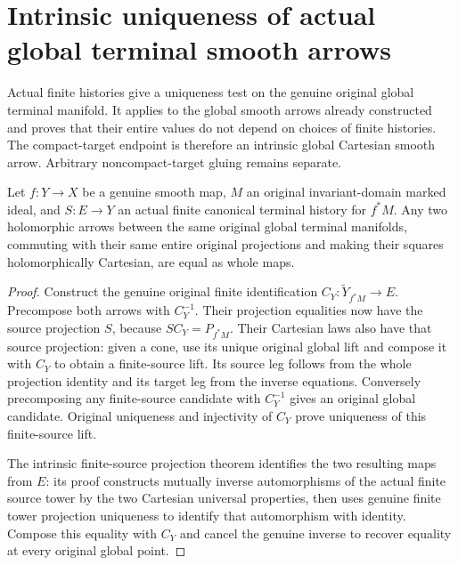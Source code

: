 \section{Intrinsic uniqueness of actual global terminal smooth arrows}

Actual finite histories give a uniqueness test on the genuine original global
terminal manifold. It applies to the global smooth arrows already constructed
and proves that their entire values do not depend on choices of finite
histories. The compact-target endpoint is therefore an intrinsic global
Cartesian smooth arrow. Arbitrary noncompact-target gluing remains separate.

\begin{theorem}
\label{hir:original-global-finite-smooth-cartesian-arrow-unique}
\leanok
{}
Let $f:Y\to X$ be a genuine smooth map, $M$ an original invariant-domain
marked ideal, and $S:E\to Y$ an actual finite canonical terminal history
for $f^*M$. Any two holomorphic arrows between the same original global
terminal manifolds, commuting with their same entire original projections
and making their squares holomorphically Cartesian, are equal as whole maps.
\end{theorem}
\begin{proof}
Construct the genuine original finite identification
$C_Y:\widetilde Y_{f^*M}\to E$. Precompose both arrows with $C_Y^{-1}$.
Their projection equalities now have the source projection $S$, because
$SC_Y=P_{f^*M}$. Their Cartesian laws also have that source projection:
given a cone, use its unique original global lift and compose it with
$C_Y$ to obtain a finite-source lift. Its source leg follows from the
whole projection identity and its target leg from the inverse equations.
Conversely precomposing any finite-source candidate with $C_Y^{-1}$ gives
an original global candidate. Original uniqueness and injectivity of $C_Y$
prove uniqueness of this finite-source lift.

The intrinsic finite-source projection theorem identifies the two resulting
maps from $E$: its proof constructs mutually inverse automorphisms of the
actual finite source tower by the two Cartesian universal properties, then
uses genuine finite tower projection uniqueness to identify that
automorphism with identity. Compose this equality with $C_Y$ and cancel
the genuine inverse to recover equality at every original global point.
\end{proof}

